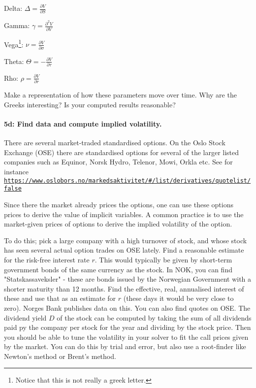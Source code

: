 \documentclass[%
oneside,                 %
final,                   %
10pt]{article}
\begin{document}
Delta: $\Delta = \frac{\partial V}{\partial S}$

Gamma: $\gamma = \frac{\partial^2 V}{\partial V}$

Vega\footnote{Notice that this is not really a greek letter.}: $\nu = \frac{\partial V}{\partial \sigma}$



Theta: $\Theta = -\frac{\partial V}{\partial \tau}$

Rho: $\rho = \frac{\partial V}{\partial r}$

Make a representation of how these parameters move over time.
Why are the Greeks interesting? Is your computed results reasonable?


\paragraph{5d: Find data and compute implied volatility.}
There are several market-traded standardised options. On the 
Oslo Stock Exchange (OSE) there are standardised options for several 
of the larger listed companies such as Equinor, Norsk Hydro,
Telenor, Mowi, Orkla etc. See for instance
\href{{https://www.oslobors.no/markedsaktivitet/#/list/derivatives/quotelist/false}}{\nolinkurl{https://www.oslobors.no/markedsaktivitet/\#/list/derivatives/quotelist/false}}

Since there the market already prices the options, one can use these options 
prices to derive the value of implicit variables. A common practice 
is to use the market-given prices of options to derive the 
implied volatility of the option. 

To do this; pick a large company with a high turnover of stock,
and whose stock has seen several actual option trades on OSE lately.
Find a reasonable estimate for the risk-free interest rate $r$. This would 
typically be given by short-term government bonds of the same currency as 
the stock. In NOK, you can find "Statskassaveksler" - these are bonds issued 
by the Norwegian Government with a shorter maturity than 12 months.
Find the effective, real, annualised interest of these and use that as an 
estimate for $r$ (these days it would be very close to zero). Norges 
Bank publishes data on this. You can also find quotes on OSE.
The dividend yield $D$ of the stock can be computed by taking the sum 
of all dividends paid py the company per stock for the year and dividing
by the stock 
price. Then you should be able to tune the volatility in your solver to 
fit the call prices given by the market. You can do this by trial and 
error, but also use a root-finder like Newton's method or Brent's 
method.
\end{document}
